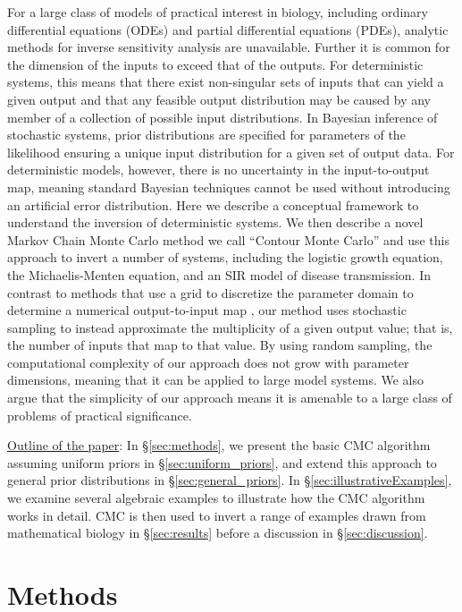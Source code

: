 \documentclass[10pt,letterpaper]{article}
\begin{document}
For a large class of models of practical interest in biology, including ordinary differential equations (ODEs) and partial differential equations (PDEs), analytic methods for inverse sensitivity analysis  are unavailable. Further it is common for the dimension of the inputs to exceed that of the outputs. For deterministic systems, this means that there exist non-singular sets of inputs that can yield a given output and that any feasible output distribution may be caused by any member of a collection of possible input distributions. In Bayesian inference of stochastic systems, prior distributions are specified for parameters of the likelihood ensuring a unique input distribution for a given set of output data. For deterministic models, however, there is no uncertainty in the input-to-output map, meaning standard Bayesian techniques cannot be used without introducing an artificial error distribution. Here we describe a conceptual framework to understand the inversion of deterministic systems. We then describe a novel Markov Chain Monte Carlo method we call ``Contour Monte Carlo'' and use this approach to invert a number of systems, including the logistic growth equation, the Michaelis-Menten equation, and an SIR model of disease transmission. In contrast to methods that use a grid to discretize the parameter domain to determine a numerical output-to-input map \cite{butler2014measure}, our method uses stochastic sampling to instead approximate the multiplicity of a given output value; that is, the number of inputs that map to that value. By using random sampling, the computational complexity of our approach does not grow with parameter dimensions, meaning that it can be applied to large model systems. We also argue that the simplicity of our approach means it is amenable to a large class of problems of practical significance.


\bigskip
\noindent\underline{Outline of the paper}: In \S \ref{sec:methods}, we present the basic CMC algorithm assuming uniform priors in \S \ref{sec:uniform_priors}, and extend this approach to general prior distributions in \S \ref{sec:general_priors}. In \S \ref{sec:illustrativeExamples}, we examine several algebraic examples to illustrate how the CMC algorithm works in detail. CMC is then used to invert a range of examples drawn from mathematical biology in \S \ref{sec:results} before a discussion in \S \ref{sec:discussion}.

\section{Methods}
\end{document}
